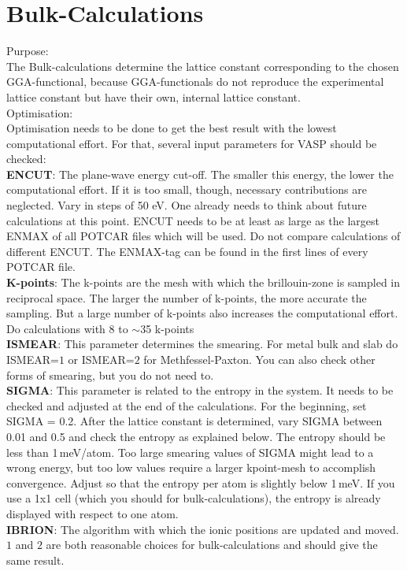 \documentclass[twoside, 11pt, titlepage, captions=nooneline, a4paper, headsepline]{scrbook}%
\begin{document}
\section{Bulk-Calculations}
\label{bulk}
Purpose:\\
The Bulk-calculations determine the lattice constant corresponding to the chosen GGA-functional, because GGA-functionals do not reproduce the experimental lattice constant but have their own, internal lattice constant.\\
Optimisation:\\
Optimisation needs to be done to get the best result with the lowest computational effort. For that, several input parameters for VASP should be checked:\\
\textbf{ENCUT}: The plane-wave energy cut-off. The smaller this energy, the lower the computational effort. If it is too small, though, necessary contributions are neglected. Vary in steps of 50 eV. One already needs to think about future calculations at this point. ENCUT needs to be at least as large as the largest ENMAX of all POTCAR files which will be used. Do not compare calculations of different ENCUT. The ENMAX-tag can be found in the first lines of every POTCAR file.\\
\textbf{K-points}: The k-points are the mesh with which the brillouin-zone is sampled in reciprocal space. The larger the number of k-points, the more accurate the sampling. But a large number of k-points also increases the computational effort. Do calculations with 8 to $\sim$35 k-points\\
\textbf{ISMEAR}: This parameter determines the smearing. For metal bulk and slab do ISMEAR=$1$ or ISMEAR=$2$ for Methfessel-Paxton. You can also check other forms of smearing, but you do not need to.\\
\textbf{SIGMA}: This parameter is related to the entropy in the system. It needs to be checked and adjusted at the end of the calculations. For the beginning, set SIGMA = 0.2. After the lattice constant is determined, vary SIGMA between 0.01 and 0.5 and check the entropy as explained below. The entropy should be less than 1\,meV/atom. Too large smearing values of SIGMA might lead to a wrong energy, but too low values require a larger kpoint-mesh to accomplish convergence. Adjust so that the entropy per atom is slightly below 1\,meV. If you use a 1x1 cell (which you should for bulk-calculations), the entropy is already displayed with respect to one atom.\\
\textbf{IBRION}: The algorithm with which the ionic positions are updated and moved. $1$ and $2$ are both reasonable choices for bulk-calculations and should give the same result.\\
\end{document}

